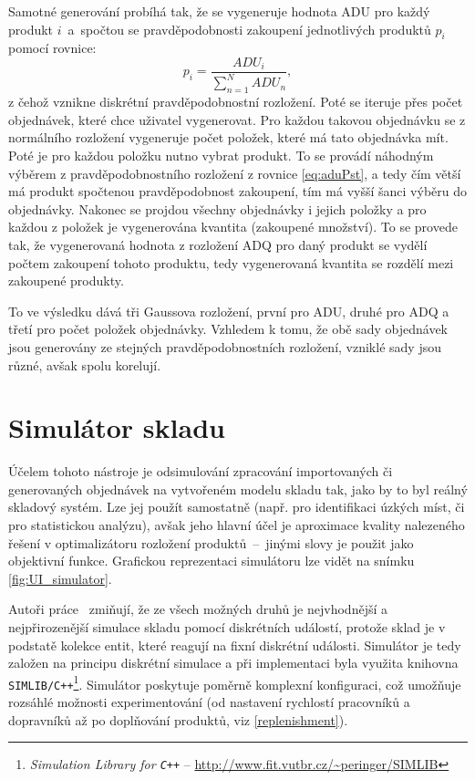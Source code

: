 Samotné generování probíhá tak, že se vygeneruje hodnota ADU pro každý produkt $i$~a~spočtou se pravděpodobnosti zakoupení jednotlivých produktů $p_i$ pomocí rovnice:
\begin{equation}
    \label{eq:aduPst}
    p_i = \frac{ADU_i}{\sum_{n=1}^{N} ADU_n},
\end{equation}
z čehož vznikne diskrétní pravděpodobnostní rozložení. Poté se iteruje přes počet objednávek, které chce uživatel vygenerovat. Pro každou takovou objednávku se z normálního rozložení vygeneruje počet položek, které má tato objednávka mít. Poté je pro každou položku nutno vybrat produkt. To se provádí náhodným výběrem z pravděpodobnostního rozložení z rovnice \ref{eq:aduPst}, a tedy čím větší má produkt spočtenou pravděpodobnost zakoupení, tím má vyšší šanci výběru do objednávky. Nakonec se projdou všechny objednávky i jejich položky a pro každou z položek je vygenerována kvantita (zakoupené množství). To se provede tak, že vygenerovaná hodnota z rozložení ADQ pro daný produkt se vydělí počtem zakoupení tohoto produktu, tedy vygenerovaná kvantita se rozdělí mezi zakoupené produkty.

To ve výsledku dává tři Gaussova rozložení, první pro ADU, druhé pro ADQ a třetí pro počet položek objednávky. Vzhledem k tomu, že obě sady objednávek jsou generovány ze stejných pravděpodobnostních rozložení, vzniklé sady jsou různé, avšak spolu korelují.


\section{Simulátor skladu}
Účelem tohoto nástroje je odsimulování zpracování importovaných či generovaných objednávek na vytvořeném modelu skladu tak, jako by to byl reálný skladový systém. Lze jej použít samostatně (např. pro identifikaci úzkých míst, či pro statistickou analýzu), avšak jeho hlavní účel je aproximace kvality nalezeného řešení v optimalizátoru rozložení produktů~--~jinými slovy je použit jako objektivní funkce. Grafickou reprezentaci simulátoru lze vidět na snímku \ref{fig:UI_simulator}.

Autoři práce~\cite{whModelSim} zmiňují, že ze všech možných druhů je nejvhodnější a nejpřirozenější simulace skladu pomocí diskrétních událostí, protože sklad je v podstatě kolekce entit, které reagují na fixní diskrétní události. Simulátor je tedy založen na principu diskrétní simulace a při implementaci byla využita knihovna \texttt{SIMLIB/C++}\footnote{\emph{Simulation Library for \texttt{C++}} -- \url{http://www.fit.vutbr.cz/~peringer/SIMLIB}}. Simulátor poskytuje poměrně komplexní konfiguraci, což umožňuje rozsáhlé možnosti experimentování (od nastavení rychlostí pracovníků a dopravníků až po doplňování produktů, viz \ref{replenishment}).

